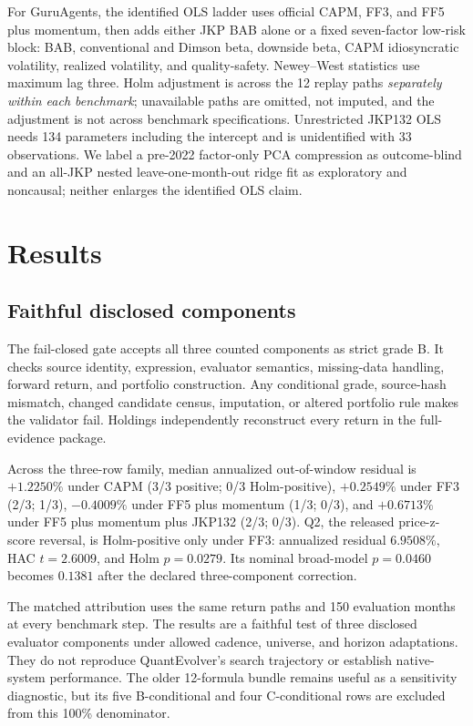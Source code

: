 \documentclass[sigconf,anonymous]{acmart}
\begin{document}
For GuruAgents, the identified OLS ladder uses official CAPM, FF3, and FF5 plus momentum, then adds either JKP BAB alone or a fixed seven-factor low-risk block: BAB, conventional and Dimson beta, downside beta, CAPM idiosyncratic volatility, realized volatility, and quality-safety. Newey--West statistics use maximum lag three. Holm adjustment is across the 12 replay paths \emph{separately within each benchmark}; unavailable paths are omitted, not imputed, and the adjustment is not across benchmark specifications. Unrestricted JKP132 OLS needs 134 parameters including the intercept and is unidentified with 33 observations. We label a pre-2022 factor-only PCA compression as outcome-blind and an all-JKP nested leave-one-month-out ridge fit as exploratory and noncausal; neither enlarges the identified OLS claim.

\section{Results}

\subsection{Faithful disclosed components}

The fail-closed gate accepts all three counted components as strict grade B. It checks source identity, expression, evaluator semantics, missing-data handling, forward return, and portfolio construction. Any conditional grade, source-hash mismatch, changed candidate census, imputation, or altered portfolio rule makes the validator fail. Holdings independently reconstruct every return in the full-evidence package.

Across the three-row family, median annualized out-of-window residual is $+1.2250\%$ under CAPM (3/3 positive; 0/3 Holm-positive), $+0.2549\%$ under FF3 (2/3; 1/3), $-0.4009\%$ under FF5 plus momentum (1/3; 0/3), and $+0.6713\%$ under FF5 plus momentum plus JKP132 (2/3; 0/3). Q2, the released price-z-score reversal, is Holm-positive only under FF3: annualized residual $6.9508\%$, HAC $t=2.6009$, and Holm $p=0.0279$. Its nominal broad-model $p=0.0460$ becomes $0.1381$ after the declared three-component correction.

The matched attribution uses the same return paths and 150 evaluation months at every benchmark step. The results are a faithful test of three disclosed evaluator components under allowed cadence, universe, and horizon adaptations. They do not reproduce QuantEvolver's search trajectory or establish native-system performance. The older 12-formula bundle remains useful as a sensitivity diagnostic, but its five B-conditional and four C-conditional rows are excluded from this 100\% denominator.
\end{document}
